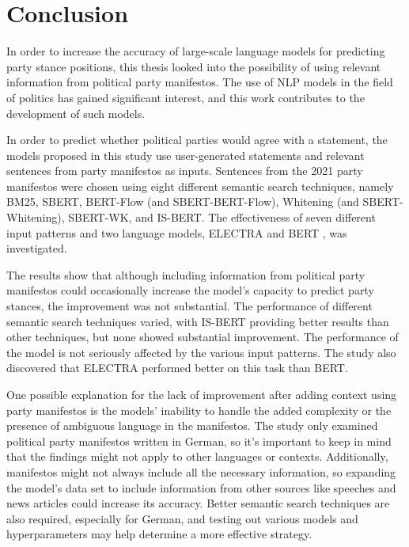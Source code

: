 \chapter{Conclusion}\label{conclusion}

In order to increase the accuracy of large-scale language models for predicting party stance positions, this thesis looked into the possibility of using relevant information from political party manifestos. The use of NLP models in the field of politics has gained significant interest, and this work contributes to the development of such models.

In order to predict whether political parties would agree with a statement, the models proposed in this study use user-generated statements and relevant sentences from party manifestos as inputs. Sentences from the 2021 party manifestos were chosen using eight different semantic search techniques, namely BM25, SBERT, BERT-Flow (and SBERT-BERT-Flow), Whitening (and SBERT-Whitening), SBERT-WK, and IS-BERT. The effectiveness of seven different input patterns and two language models, ELECTRA \citep{clark2020electra} and BERT \citep{devlin2018bert}, was investigated.

The results show that although including information from political party manifestos could occasionally increase the model's capacity to predict party stances, the improvement was not substantial. The performance of different semantic search techniques varied, with IS-BERT providing better results than other techniques, but none showed substantial improvement. The performance of the model is not seriously affected by the various input patterns. The study also discovered that ELECTRA performed better on this task than BERT.

One possible explanation for the lack of improvement after adding context using party manifestos is the models' inability to handle the added complexity or the presence of ambiguous language in the manifestos. The study only examined political party manifestos written in German, so it's important to keep in mind that the findings might not apply to other languages or contexts. Additionally, manifestos might not always include all the necessary information, so expanding the model's data set to include information from other sources like speeches and news articles could increase its accuracy. Better semantic search techniques are also required, especially for German, and testing out various models and hyperparameters may help determine a more effective strategy.